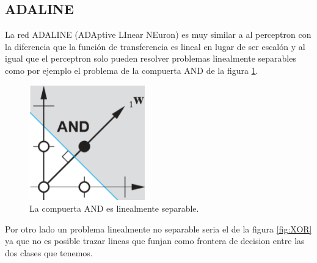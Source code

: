 \documentclass[12pt, titlepage]{article}
\begin{document}
        \subsection{ADALINE}
        La red ADALINE (ADAptive LInear NEuron) es muy similar a al perceptron con la diferencia que la función de transferencia es lineal en lugar de ser escalón y al igual que el perceptron solo pueden resolver problemas linealmente separables como por ejemplo el problema de la compuerta AND de la figura \ref{fig:AND}. \cite{pagina}
        \begin{figure}[H]
            \begin{center}
                \includegraphics[width=5cm]{img/adaline/AND.png}
                \caption{La compuerta AND es linealmente separable. \cite{libro1}}
                \label{fig:AND}
            \end{center}
        \end{figure}
        Por otro lado un problema linealmente no separable seria el de la figura \ref{fig:XOR} ya que no es posible trazar lineas que funjan como frontera de decision entre las dos clases que tenemos.
        
\end{document}
